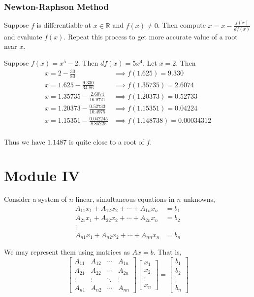 \subsection{Newton-Raphson Method}
	Suppose $f$ is differentiable at $x \in \mathbb{R}$ and $f(x) \ne 0$. Then compute $x = x - \frac{f(x)}{df(x)}$ and evaluate $f(x)$. Repeat this process to get more accurate value of a root near $x$.

\begin{remark}
	Suppose $f(x) = x^5 - 2$. Then $df(x) = 5x^4$. Let $x = 2$. Then\\
	\begin{align*}
		x = 2 - \frac{30}{80} & \implies f(1.625) = 9.330 \\
		x = 1.625 - \frac{9.330}{34.86} & \implies f(1.35735) = 2.6074 \\
		x = 1.35735 - \frac{2.6074}{16.9721} & \implies f(1.20373) = 0.52733 \\
		x = 1.20373 - \frac{0.52733}{10.4975} & \implies f(1.15351) = 0.04224 \\
		x = 1.15351 - \frac{0.042245}{8.85225} & \implies f(1.148738) = 0.00034312 \\
	\end{align*}

	Thus we have $1.1487$ is quite close to a root of $f$.
\end{remark}

\chapter{Module IV}

	Consider a system of $n$ linear, simultaneous equations in $n$ unknowns,
	\begin{align*}
		A_{11}x_1 + A_{12}x_2 + \cdots + A_{1n}x_n & = b_1 \\
		A_{21}x_1 + A_{22}x_2 + \cdots + A_{2n}x_n & = b_2 \\
		\vdots \\
		A_{n1}x_1 + A_{n2}x_2 + \cdots + A_{nn}x_n & = b_n 
	\end{align*}

	We may represent them using matrices as $Ax = b$. That is,
	\[ \begin{bmatrix} A_{11} & A_{12} & \cdots & A_{1n} \\ A_{21} & A_{22} & \cdots & A_{2n} \\ \vdots & \vdots & \ddots & \vdots \\ A_{n1} & A_{n2} & \cdots & A_{nn} \end{bmatrix} \begin{bmatrix} x_1 \\ x_2 \\ \vdots \\ x_n \end{bmatrix} = \begin{bmatrix} b_1 \\ b_2 \\ \vdots \\ b_n \end{bmatrix} \]
		

